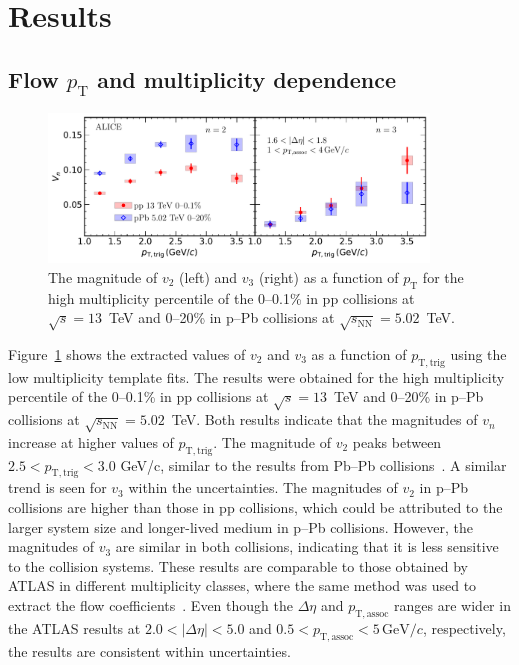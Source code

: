 
\section {Results}
\label{sec:results}
\subsection{Flow $p_{\mathrm{T}}$ and multiplicity dependence}

\begin{figure}[h!]
	\centering
	\hspace{-3em}\includegraphics[width=0.9\textwidth]{figures/Fig2_vn_pppPb.pdf} %
	\caption{The magnitude of $v_2$ (left) and $v_3$ (right) as a function of $p_\mathrm{T}$ for the high multiplicity percentile of the 0--0.1\% in pp collisions at $\sqrt{s}=13$~TeV and 0--20\% in p--Pb collisions at $\sqrt{s_\mathrm{NN}} = 5.02$~TeV.}
	\label{fig:vn}
\end{figure}

Figure~\ref{fig:vn} shows the extracted values of $v_2$ and $v_3$ as a function of $p_{\mathrm{T,trig}}$ using the low multiplicity template fits. The results were obtained for the high multiplicity percentile of the 0--0.1\% in pp collisions at $\sqrt{s}=13$~TeV and 0--20\% in p--Pb collisions at $\sqrt{s_\mathrm{NN}}=5.02$~TeV. Both results indicate that the magnitudes of $v_n$ increase at higher values of $p_{\mathrm{T,trig}}$. The magnitude of $v_2$ peaks between $2.5<p_{\mathrm{T,trig}}<3.0$ GeV/c, similar to the results from Pb--Pb collisions~\cite{ALICE:2018yph}. A similar trend is seen for $v_3$ within the uncertainties. The magnitudes of $v_2$ in p--Pb collisions are higher than those in pp collisions, which could be attributed to the larger system size and longer-lived medium in p--Pb collisions. However, the magnitudes of $v_3$ are similar in both collisions, indicating that it is less sensitive to the collision systems.
These results are comparable to those obtained by ATLAS in different multiplicity classes, where the same method was used to extract the flow coefficients~\cite{ATLAS:2016yzd}. Even though the $\Delta\eta$ and $p_{\mathrm{T,assoc}}$ ranges are wider in the ATLAS results at $2.0<|\Delta\eta|<5.0$ and $0.5<p_{\mathrm{T,assoc}}<5\,\mathrm{GeV}/c$, respectively, the results are consistent within uncertainties.

